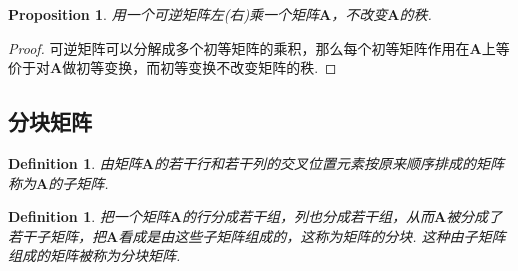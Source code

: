 \documentclass{article}
\newtheorem{proposition}[theorem]{Proposition}
\newtheorem{definition}[theorem]{Definition}
\newcommand{\mbf}[1]{\bm{#1}}
\begin{document}
\begin{proposition}\label{invertible: mul-rank-no-change}
\rm 用一个可逆矩阵左(右)乘一个矩阵$\mbf{A}$，不改变$\mbf{A}$的秩.
\end{proposition}

\begin{proof}
可逆矩阵可以分解成多个初等矩阵的乘积，那么每个初等矩阵作用在$\mbf{A}$上等价于对$\mbf{A}$做初等变换，而初等变换不改变矩阵的秩. 
\end{proof}

\subsection{分块矩阵}

\begin{definition}
\rm 由矩阵$\mbf{A}$的若干行和若干列的交叉位置元素按原来顺序排成的矩阵称为$\mbf{A}$的子矩阵.
\end{definition}

\begin{definition}
\rm 把一个矩阵$\mbf{A}$的行分成若干组，列也分成若干组，从而$\mbf{A}$被分成了若干子矩阵，把$\mbf{A}$看成是由这些子矩阵组成的，这称为矩阵的分块. 这种由子矩阵组成的矩阵被称为分块矩阵.
\end{definition}
\end{document}
